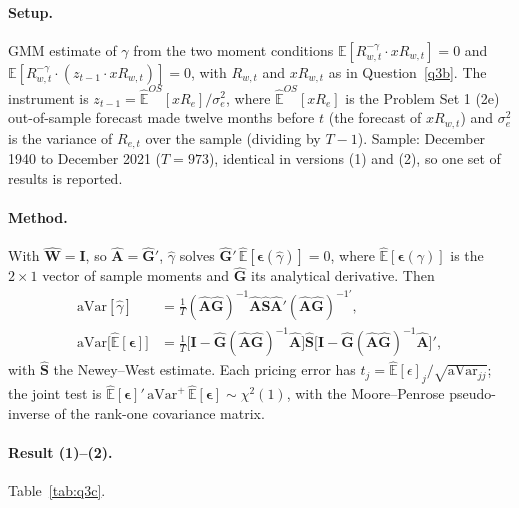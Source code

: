 \documentclass[11pt]{article}
\begin{document}
\paragraph{Setup.}
GMM estimate of $\gamma$ from the two moment conditions
$\mathbb{E}[R_{w,t}^{-\gamma} \cdot xR_{w,t}] = 0$ and
$\mathbb{E}[R_{w,t}^{-\gamma} \cdot (z_{t-1} \cdot xR_{w,t})] = 0$, with $R_{w,t}$ and $xR_{w,t}$ as in
Question~\ref{q3b}. The instrument is $z_{t-1} = \widehat{\mathbb{E}}^{OS}[xR_e] / \sigma^2_e$, where
$\widehat{\mathbb{E}}^{OS}[xR_e]$ is the Problem Set 1 (2e) out-of-sample forecast made twelve months before
$t$ (the forecast of $xR_{w,t}$) and $\sigma^2_e$ is the variance of $R_{e,t}$ over the sample (dividing by
$T-1$). Sample: December 1940 to December 2021 ($T = 973$), identical in versions (1) and (2), so one set
of results is reported.

\paragraph{Method.}
With $\hat{\mathbf{W}} = \mathbf{I}$, so $\hat{\mathbf{A}} = \hat{\mathbf{G}}'$, $\hat{\gamma}$ solves
$\hat{\mathbf{G}}'\,\widehat{\mathbb{E}}[\bm{\epsilon}(\hat{\gamma})] = 0$, where
$\widehat{\mathbb{E}}[\bm{\epsilon}(\gamma)]$ is the $2 \times 1$ vector of sample moments and
$\hat{\mathbf{G}}$ its analytical derivative. Then
\begin{align*}
  \mathrm{aVar}[\hat{\gamma}] &= \tfrac{1}{T}(\hat{\mathbf{A}}\hat{\mathbf{G}})^{-1}\hat{\mathbf{A}}\hat{\mathbf{S}}\hat{\mathbf{A}}'(\hat{\mathbf{A}}\hat{\mathbf{G}})^{-1\prime}, \\
  \mathrm{aVar}\big[\widehat{\mathbb{E}}[\bm{\epsilon}]\big] &= \tfrac{1}{T}\big[\mathbf{I} - \hat{\mathbf{G}}(\hat{\mathbf{A}}\hat{\mathbf{G}})^{-1}\hat{\mathbf{A}}\big]\hat{\mathbf{S}}\big[\mathbf{I} - \hat{\mathbf{G}}(\hat{\mathbf{A}}\hat{\mathbf{G}})^{-1}\hat{\mathbf{A}}\big]',
\end{align*}
with $\hat{\mathbf{S}}$ the Newey--West estimate. Each pricing error has
$t_j = \widehat{\mathbb{E}}[\epsilon]_j / \sqrt{\mathrm{aVar}_{jj}}$; the joint test is
$\widehat{\mathbb{E}}[\bm{\epsilon}]'\,\mathrm{aVar}^{+}\,\widehat{\mathbb{E}}[\bm{\epsilon}] \sim \chi^2(1)$,
with the Moore--Penrose pseudo-inverse of the rank-one covariance matrix.

\paragraph{Result (1)--(2).}
Table~\ref{tab:q3c}.
\end{document}
